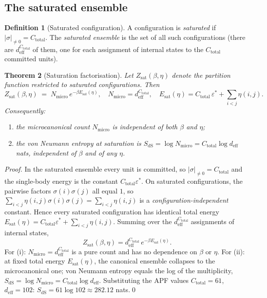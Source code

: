 \documentclass[11pt,a4paper]{article}
\newtheorem{theorem}{Theorem}[section]
\theoremstyle{definition}
\newtheorem{definition}[theorem]{Definition}
\newcommand{\epsstar}{\varepsilon^{\ast}}
\newcommand{\Ctot}{C_{\mathrm{total}}}
\newcommand{\deff}{d_{\mathrm{eff}}}
\begin{document}
\subsection{The saturated ensemble}

\begin{definition}[Saturated configuration]
A configuration is \emph{saturated} if $|\sigma|_{\neq 0}=\Ctot$.  The \emph{saturated ensemble} is the set of all such configurations (there are $\deff^{\Ctot}$ of them, one for each assignment of internal states to the $\Ctot$ committed units).
\end{definition}

\begin{theorem}[Saturation factorisation]
\label{thm:Zsat}
Let $Z_{\mathrm{sat}}(\beta,\eta)$ denote the partition function restricted to saturated configurations.  Then
\[
\boxed{
  Z_{\mathrm{sat}}(\beta,\eta) \;=\; N_{\mathrm{micro}}\,e^{-\beta E_{\mathrm{sat}}(\eta)},
\quad
  N_{\mathrm{micro}} = \deff^{\Ctot},
\quad
  E_{\mathrm{sat}}(\eta) = \Ctot\,\epsstar + \sum_{i<j}\eta(i,j).
}
\]
Consequently:
\begin{enumerate}[label=(\roman*),nosep]
  \item the microcanonical count $N_{\mathrm{micro}}$ is independent of both $\beta$ and $\eta$;
  \item the von Neumann entropy at saturation is $S_{\mathrm{dS}}=\log N_{\mathrm{micro}}=\Ctot\log\deff$ nats, independent of $\beta$ and of any $\eta$.
\end{enumerate}
\end{theorem}

\begin{proof}
In the saturated ensemble every unit is committed, so $|\sigma|_{\neq 0}=\Ctot$ and the single-body energy is the constant $\Ctot\epsstar$.  On saturated configurations, the pairwise factors $\sigma(i)\sigma(j)$ all equal $1$, so $\sum_{i<j}\eta(i,j)\sigma(i)\sigma(j)=\sum_{i<j}\eta(i,j)$ is a \emph{configuration-independent} constant.  Hence every saturated configuration has identical total energy $E_{\mathrm{sat}}(\eta)=\Ctot\epsstar+\sum_{i<j}\eta(i,j)$.  Summing over the $\deff^{\Ctot}$ assignments of internal states,
\[
  Z_{\mathrm{sat}}(\beta,\eta) = \deff^{\Ctot}\,e^{-\beta E_{\mathrm{sat}}(\eta)}.
\]
For (i): $N_{\mathrm{micro}}=\deff^{\Ctot}$ is a pure count and has no dependence on $\beta$ or $\eta$.  For (ii): at fixed total energy $E_{\mathrm{sat}}(\eta)$, the canonical ensemble collapses to the microcanonical one; von Neumann entropy equals the log of the multiplicity, $S_{\mathrm{dS}}=\log N_{\mathrm{micro}}=\Ctot\log\deff$.  Substituting the APF values $\Ctot=61$, $\deff=102$: $S_{\mathrm{dS}}=61\log 102\approx 282.12$ nats.\qed
\end{proof}
\end{document}
